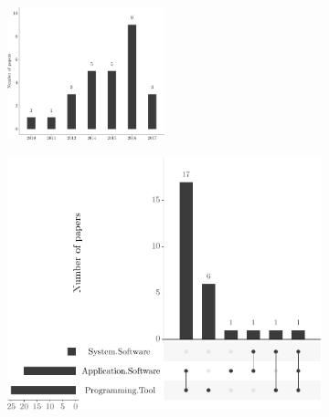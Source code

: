 \begin{figure}[!htp]
  \begin{subfigure}{.94\textwidth}
    \centering
    \includegraphics[width=0.5\textwidth]{figures/survey-summary-by-year-in-bar.pdf}
    \caption{}    
    \label{fig:classification_by_publication_year}
  \end{subfigure}\hfill
  \begin{subfigure}{.49\textwidth}
    \centering
    \includegraphics[width=\textwidth]{figures/distribution-by-floss-in-ups.pdf}
    \caption{}
    \label{fig:distribution_by_floss}
  \end{subfigure}\hfill
  \begin{subfigure}{.49\textwidth}
    \centering

\end{subfigure}
\end{figure}
